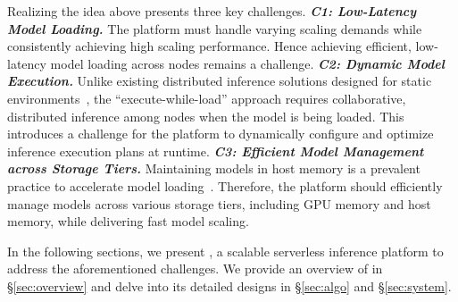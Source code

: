 Realizing the idea above presents three key challenges.
\textbf{\emph{C1: Low-Latency Model Loading.}}
The platform must handle varying scaling demands while consistently achieving high scaling performance.
Hence achieving efficient, low-latency model loading across nodes remains a challenge.
\textbf{\emph{C2: Dynamic Model Execution.}}
Unlike existing distributed inference solutions designed for static environments~\cite{zhang_shepherd_nodate,li_alpaserve_2023}, the ``execute-while-load'' approach requires collaborative, distributed inference among nodes when the model is being loaded.
This introduces a challenge for the platform to dynamically configure and optimize inference execution plans at runtime.
\textbf{\emph{C3: Efficient Model Management across Storage Tiers.}}
Maintaining models in host memory is a prevalent practice to accelerate model loading~\cite{faaswap,fu_serverlessllm_2024,bai_pipeswitch_nodate}.
Therefore, the platform should efficiently manage models across various storage tiers, including GPU memory and host memory, while delivering fast model scaling.

In the following sections, we present \SysName, a scalable serverless inference platform to address the aforementioned challenges.
We provide an overview of \SysName in \S\ref{sec:overview} and delve into its detailed designs in \S\ref{sec:algo} and \S\ref{sec:system}.



